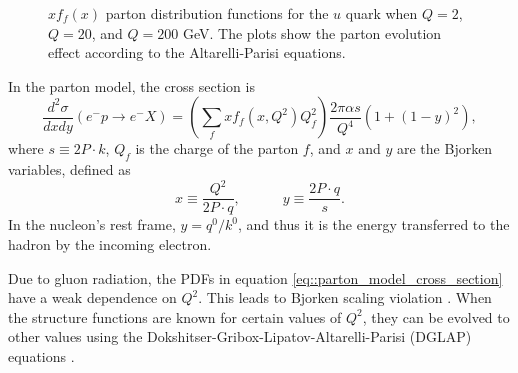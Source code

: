 \begin{figure}[b!] %
    \centering{}
    \caption[$Q^2$ dependence of $x$ PDF for the $u$ quark.]{$xf_f(x)$ parton distribution functions for the $u$ quark when $Q = 2$, $Q = 20$, and $Q = 200$ GeV.
    The plots show the parton evolution effect according to the Altarelli-Parisi equations.}
    \label{fig::q2dependenceu}
\end{figure}

In the parton model, the cross section is
\begin{equation}
    \label{eq::parton_model_cross_section}
    \frac{d^2\sigma}{dxdy} \left( e^-p \rightarrow e^-X \right) =
            \left( \sum_f xf_f \left( x, Q^2 \right) Q_f^2 \right)
            \frac{2\pi\alpha s}{Q^4} \left( 1 + \left( 1 - y \right)^2 \right),
\end{equation}
where $s \equiv 2P\cdot k$, $Q_f$ is the charge of the parton $f$, and $x$ and $y$ are the Bjorken variables, defined as
\begin{equation*}
    x \equiv \frac{Q^2}{2P\cdot q}, \hspace{36pt} y \equiv \frac{2 P\cdot q}{s}.
\end{equation*}
In the nucleon's rest frame, $y = q^0/k^0$, and thus it is the energy transferred to the hadron by the incoming electron.

Due to gluon radiation, the PDFs in equation \eqref{eq::parton_model_cross_section} have a weak dependence on $Q^2$.
This leads to Bjorken scaling violation \cite{halzen1991}.
When the structure functions are known for certain values of $Q^2$, they can be evolved to other values using the Dokshitser-Gribox-Lipatov-Altarelli-Parisi (DGLAP) equations \cite{dokshitzer1991}.

